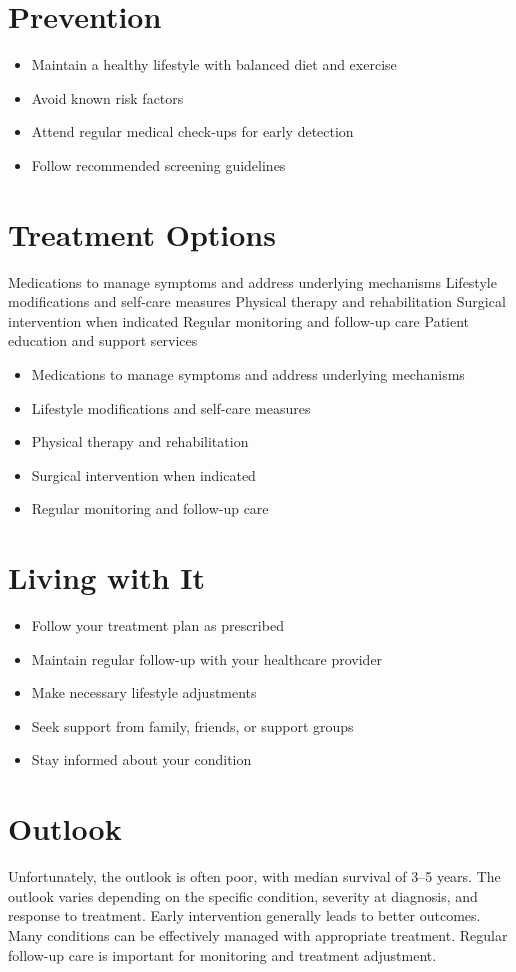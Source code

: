 \section{Prevention}
\begin{itemize}[noitemsep]
  \item Maintain a healthy lifestyle with balanced diet and exercise
  \item Avoid known risk factors
  \item Attend regular medical check-ups for early detection
  \item Follow recommended screening guidelines
\end{itemize}
\section{Treatment Options}
Medications to manage symptoms and address underlying mechanisms Lifestyle modifications and self-care measures Physical therapy and rehabilitation Surgical intervention when indicated Regular monitoring and follow-up care Patient education and support services

\begin{itemize}[noitemsep]
  \item Medications to manage symptoms and address underlying mechanisms
  \item Lifestyle modifications and self-care measures
  \item Physical therapy and rehabilitation
  \item Surgical intervention when indicated
  \item Regular monitoring and follow-up care
\end{itemize}
\section{Living with It}
\begin{itemize}[noitemsep]
  \item Follow your treatment plan as prescribed
  \item Maintain regular follow-up with your healthcare provider
  \item Make necessary lifestyle adjustments
  \item Seek support from family, friends, or support groups
  \item Stay informed about your condition
\end{itemize}
\section{Outlook}
Unfortunately, the outlook is often poor, with median survival of 3--5 years. The outlook varies depending on the specific condition, severity at diagnosis, and response to treatment. Early intervention generally leads to better outcomes. Many conditions can be effectively managed with appropriate treatment. Regular follow-up care is important for monitoring and treatment adjustment.
